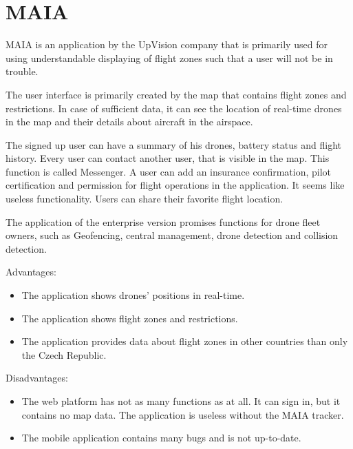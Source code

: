 \section{MAIA}\label{sec:maia}
MAIA is an application by the UpVision company that is primarily used for using understandable displaying of flight zones such that a user will not be in trouble.\cite{maia}

The user interface is primarily created by the map that contains flight zones and restrictions.
In case of sufficient data, it can see the location of real-time drones in the map and their details about aircraft in the airspace.

The signed up user can have a summary of his drones, battery status and flight history.
Every user can contact another user, that is visible in the map.
This function is called Messenger.
A user can add an insurance confirmation, pilot certification and permission for flight operations in the application.
It seems like useless functionality.
Users can share their favorite flight location.

The application of the enterprise version promises functions for drone fleet owners, such as Geofencing, central management, drone detection and collision detection.

Advantages:
\begin{itemize}
    \item The application shows drones' positions in real-time.
    \item The application shows flight zones and restrictions.
    \item The application provides data about flight zones in other countries than only the Czech Republic.
\end{itemize}
Disadvantages:
\begin{itemize}
    \item The web platform has not as many functions as at all.
    It can sign in, but it contains no map data.
    The application is useless without the MAIA tracker.
    \item The mobile application contains many bugs and is not up-to-date.
\end{itemize}